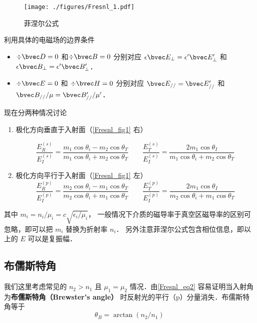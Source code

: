 

\begin{figure}[ht]
\centering
\texttt{[image: ./figures/Fresnl\_1.pdf]}
\caption{菲涅尔公式} \label{Fresnl_fig1}
\end{figure}
 
利用具体的电磁场的边界条件 %
\begin{itemize}
\item $\div \bvec D = 0$ 和$\div \bvec B = 0$  分别对应 $\epsilon \bvec E_\bot = \epsilon' \bvec E'_\bot$ 和 $\epsilon \bvec B_\bot = \epsilon' \bvec B'_\bot$．

\item $\div \bvec E = 0$ 和 $\div \bvec H = 0$ 分别对应 $\bvec E_{//} = \bvec E'_{//}$ 和 $\bvec B_{//}/\mu = \bvec B'_{//}/\mu'$．
\end{itemize}

现在分两种情况讨论
\begin{enumerate}
\item 极化方向垂直于入射面（\autoref{Fresnl_fig1} 右）

\begin{equation}
\frac{E_R^{(s)}}{E_I^{(s)}} =  \frac{m_1\cos{\theta_i} - m_2\cos\theta_T}{m_1\cos\theta_i + m_2\cos\theta_T}
\qquad
\frac{E_T^{(s)}}{E_I^{(s)}} = \frac{2 m_1\cos\theta_I}{m_1\cos\theta_i + m_2\cos\theta_T}
\end{equation}

\item 极化方向平行于入射面（\autoref{Fresnl_fig1} 左）
\begin{equation}\label{Fresnl_eq2}
\frac{E_R^{(p)}}{E_I^{(p)}} =  \frac{m_2\cos\theta_i - m_1\cos\theta_T}{m_2 \cos\theta_i + m_1\cos\theta_T}
\qquad
\frac{E_T^{(p)}}{E_I^{(p)}} =  \frac{2 m_1\cos\theta_I}{m_2\cos\theta_i + m_1\cos\theta_T}
\end{equation}
\end{enumerate}
其中 $m_i=n_i/\mu_i = c\sqrt{\epsilon_i/\mu_i}$， 一般情况下介质的磁导率于真空区磁导率的区别可忽略，即可以把 $m_i$ 替换为折射率 $n_i$． 另外注意菲涅尔公式包含相位信息，即以上的 $E$ 可以是复振幅．

\subsection{布儒斯特角}
我们这里考虑常见的 $n_2>n_1$ 且 $\mu_1 = \mu_2$ 情况．由\autoref{Fresnl_eq2} 容易证明当入射角为\textbf{布儒斯特角（Brewster's angle）} 时反射光的平行（p）分量消失．布儒斯特角等于
\begin{equation}
\theta_B = \arctan (n_2/n_1)
\end{equation}
